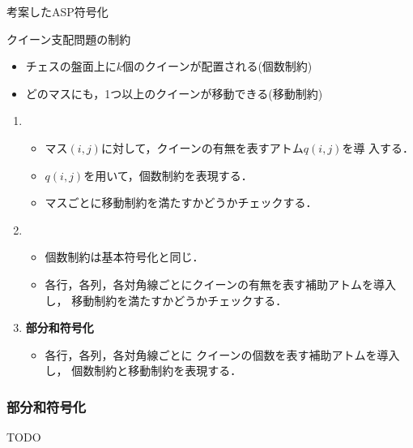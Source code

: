 \documentclass[dvipdfmx,10pt]{beamer}
\begin{document}
\begin{frame}{考案したASP符号化}

  \begin{block}{クイーン支配問題の制約}
    \begin{itemize}
    \item チェスの盤面上に$k$個のクイーンが配置される(個数制約)
    \item どのマスにも，1つ以上のクイーンが移動できる(移動制約)
    \end{itemize}
  \end{block}

  \begin{enumerate}
  \item {}
    \begin{itemize}
    \item マス$(i,j)$に対して，クイーンの有無を表すアトム$q(i,j)$を導
      入する．
    \item $q(i,j)$を用いて，個数制約を表現する．
    \item マスごとに移動制約を満たすかどうかチェックする．
    \end{itemize}
 \item {}
   \begin{itemize}
    \item 個数制約は基本符号化と同じ．
    \item 各行，各列，各対角線ごとにクイーンの有無を表す補助アトムを導入し，
      移動制約を満たすかどうかチェックする．      
   \end{itemize}
 \item \alert{\bf 部分和符号化}
   \begin{itemize}
   \item 各行，各列，各対角線ごとに
     クイーンの個数を表す補助アトムを導入し，
     個数制約と移動制約を表現する．
   \end{itemize}
 \end{enumerate}
\end{frame}


%
%
\begin{frame}\frametitle{部分和符号化}
TODO
\end{frame}
\end{document}
